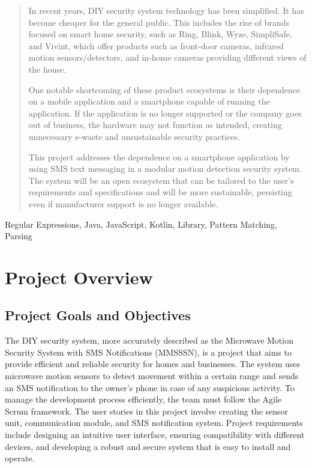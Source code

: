 \documentclass[conference]{IEEEtran}
\begin{document}
\begin{abstract}
      In recent years, DIY security system technology has been simplified. It has become cheaper for the general public.
      This includes the rise of brands focused on smart home security, such as Ring, Blink, Wyze, SimpliSafe, and Vivint,
      which offer products such as front-door cameras, infrared motion sensors/detectors, and in-home cameras
      providing different views of the house.

      One notable shortcoming of these product ecosystems is their dependence on a mobile application and a smartphone
      capable of running the application. If the application is no longer supported or the company goes out of business,
      the hardware may not function as intended, creating unnecessary e-waste and unsustainable security practices.

      This project addresses the dependence on a smartphone application by using SMS text messaging in a modular motion
      detection security system. The system will be an open ecosystem that can be tailored to the user's requirements and
      specifications and will be more sustainable, persisting even if manufacturer support is no longer available.

\end{abstract}

\begin{IEEEkeywords}
      Regular Expressions, Java, JavaScript, Kotlin, Library, Pattern Matching, Parsing
\end{IEEEkeywords}

\section{Project Overview}

\subsection{Project Goals and Objectives}
The DIY security system, more accurately described as the Microwave Motion Security System
with SMS Notifications (MMSSSN), is a project that aims to provide efficient and reliable
security for homes and businesses. The system uses microwave motion sensors to detect
movement within a certain range and sends an SMS notification to the owner's phone in
case of any suspicious activity. To manage the development process efficiently, the
team must follow the Agile Scrum framework. The user stories in this project involve
creating the sensor unit, communication module, and SMS notification system.
Project requirements include designing an intuitive user interface, ensuring
compatibility with different devices, and developing a robust and secure system that
is easy to install and operate.
\end{document}
